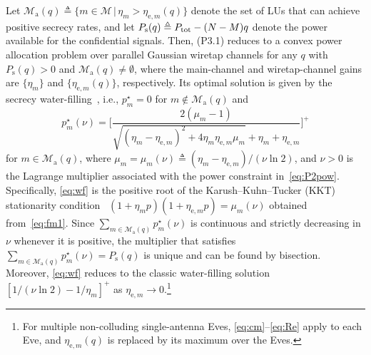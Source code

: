 \documentclass[journal]{IEEEtran}
\begin{document}
Let $\mathcal M_{\mathrm a}(q)\triangleq\{m\in\mathcal M\,|\,\eta_m>\eta_{\mathrm{e},m}(q)\}$ denote the set of LUs that can achieve positive secrecy rates, and let $P_{\mathrm s}(q)\triangleq P_{\mathrm{tot}}-(N-M)q$ denote the power available for the confidential signals. Then, (P3.1) reduces to a convex power allocation problem over parallel Gaussian wiretap channels for any $q$ with $P_{\mathrm s}(q)>0$ and $\mathcal M_{\mathrm a}(q)\neq\emptyset$, where the main-channel and wiretap-channel gains are $\{\eta_m\}$ and $\{\eta_{\mathrm{e},m}(q)\}$, respectively. Its optimal solution is given by the secrecy water-filling~\cite{Gopala2008,Liang2008}, i.e., $p_m^\star=0$ for $m\notin\mathcal M_{\mathrm a}(q)$ and
\begin{equation}\label{eq:wf}
p_m^\star(\nu)=\bigg[\frac{2(\mu_m-1)}{\sqrt{(\eta_m-\eta_{\mathrm{e},m})^2+4\eta_m\eta_{\mathrm{e},m}\mu_m}+\eta_m+\eta_{\mathrm{e},m}}\bigg]^+
\end{equation}
for $m\in\mathcal M_{\mathrm a}(q)$, where $\mu_m=\mu_m(\nu)\triangleq(\eta_m-\eta_{\mathrm{e},m})/(\nu\ln2)$, and $\nu>0$ is the Lagrange multiplier associated with the power constraint in~\eqref{eq:P2pow}. Specifically, \eqref{eq:wf} is the positive root of the Karush--Kuhn--Tucker (KKT) stationarity condition~\cite{Boyd2004} $(1+\eta_mp)(1+\eta_{\mathrm{e},m}p)=\mu_m(\nu)$ obtained from~\eqref{eq:fm1}. Since $\sum_{m\in\mathcal M_{\mathrm a}(q)}p_m^\star(\nu)$ is continuous and strictly decreasing in $\nu$ whenever it is positive, the multiplier that satisfies $\sum_{m\in\mathcal M_{\mathrm a}(q)}p_m^\star(\nu)=P_{\mathrm s}(q)$ is unique and can be found by bisection. Moreover, \eqref{eq:wf} reduces to the classic water-filling solution $[1/(\nu\ln2)-1/\eta_m]^+$ as $\eta_{\mathrm{e},m}\to0$.\footnote{For multiple non-colluding single-antenna Eves, \eqref{eq:cm}--\eqref{eq:Re} apply to each Eve, and $\eta_{\mathrm{e},m}(q)$ is replaced by its maximum over the Eves.}
\end{document}
